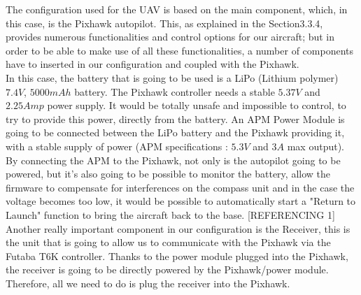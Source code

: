 \documentclass[12pt]{article}
\begin{document}
\noindent The configuration used for the UAV is based on the main component, which, in this case, is the Pixhawk autopilot. This, as explained in the Section3.3.4, provides numerous functionalities and control options for our aircraft; but in order to be able to make use of all these functionalities, a number of components have to inserted in our configuration and coupled with the Pixhawk. \\

\noindent In this case, the battery that is going to be used is a LiPo (Lithium polymer) $7.4V$, $5000mAh$ battery. The Pixhawk controller needs a stable $5.37V$ and $2.25Amp$ power supply. It would be totally unsafe and impossible to control, to try to provide this power, directly from the battery. An APM Power Module is going to be connected between the LiPo battery and the Pixhawk providing it, with a stable supply of power (APM specifications : $5.3V$ and $3A$ max output). By connecting the APM to the Pixhawk, not only is the autopilot going to be powered, but it's also going to be possible to monitor the battery, allow the firmware to compensate for interferences on the compass unit and in the case the voltage becomes too low, it would be possible to automatically start a "Return to Launch" function to bring the aircraft back to the base. [REFERENCING 1] \\

\noindent Another really important component in our configuration is the Receiver, this is the unit that is going to allow us to communicate with the Pixhawk via the Futaba T6K controller. Thanks to the power module plugged into the Pixhawk, the receiver is going to be directly powered by the Pixhawk/power module. Therefore, all we need to do is plug the receiver into the Pixhawk. \\
\end{document}
